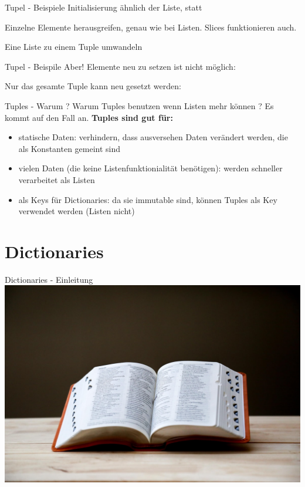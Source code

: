 \begin{frame}{Tupel - Beispiele}
	Initialisierung ähnlich der Liste, \codeline{()} statt \codeline{[]}
	
	\pause
	Einzelne Elemente herausgreifen, genau wie bei Listen. Slices funktionieren auch.
	
	\pause
	Eine Liste zu einem Tuple umwandeln
	
\end{frame}
\begin{frame}{Tupel - Beispile}
	Aber! Elemente neu zu setzen ist nicht möglich:
	
	\pause
	Nur das gesamte Tuple kann neu gesetzt werden:
	
\end{frame}

\begin{frame}{Tuples - Warum ?}
	Warum Tuples benutzen wenn Listen mehr können ? Es kommt auf den Fall an.
	\linebreak\linebreak
	\textbf{Tuples sind gut für:}
	\begin{itemize}
		\pause
		\item statische Daten: verhindern, dass ausversehen Daten verändert werden, die als Konstanten gemeint sind
		\pause
		\item vielen Daten (die keine Listenfunktionialität benötigen): werden schneller verarbeitet als Listen
		\pause
		\item als Keys für Dictionaries: da sie immutable sind, können Tuples als Key verwendet werden (Listen nicht)
	\end{itemize}
\end{frame}	

\section{Dictionaries}
\begin{frame}{Dictionaries - Einleitung}
	\includegraphics[width=\linewidth]{resources/03bool_fun_dict/lexikon.jpeg}
\end{frame}

